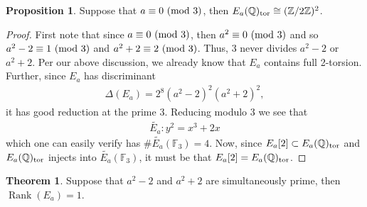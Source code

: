 \documentclass{article}
\newcommand{\Q}{\mathbb{Q}}
\newcommand{\Z}{\mathbb{Z}}
\theoremstyle{definition}
\newcommand{\F}{\mathbb{F}}
\newtheorem{theorem}{Theorem}[section]
\newtheorem{prop}{Proposition}
\DeclareMathOperator{\Rank}{Rank}
\begin{document}
\begin{prop}
    Suppose that $a \equiv 0 \textnormal{ (mod 3)}$, then $E_a(\Q)_\textnormal{tor} \cong (\Z/2\Z)^2$.
\end{prop}

\begin{proof}
    First note that since $a \equiv 0 \textnormal{ (mod 3)}$, then $a^2 \equiv 0 \textnormal{ (mod 3)}$ and so $a^2 - 2 \equiv 1 \textnormal{ (mod 3)}$ and $a^2 + 2 \equiv 2 \textnormal{ (mod 3)}$. Thus, $3$ never divides $a^2-2$ or $a^2+2$. Per our above discussion, we already know that $E_a$ contains full 2-torsion. Further, since $E_a$ has discriminant
    \begin{eqnarray*}
        \Delta(E_a) = 2^8(a^2-2)^2(a^2+2)^2,
    \end{eqnarray*}
    it has good reduction at the prime 3. Reducing modulo 3 we see that 
    \begin{eqnarray*}
        \tilde{E_a} \colon y^2 = x^3 + 2x
    \end{eqnarray*}
    which one can easily verify has $\#\tilde{E_a}(\F_3) = 4$. Now, since $E_a[2] \subset E_a(\Q)_\textnormal{tor}$ and $E_a(\Q)_\textnormal{tor}$ injects into $\tilde{E_a}(\F_3)$, it must be that $E_a[2] = E_a(\Q)_\textnormal{tor}$.
\end{proof}

\begin{theorem}
    Suppose that $a^2-2$ and $a^2 + 2$ are simultaneously prime, then $\Rank(E_a) = 1$. \label{rankE_a}
\end{theorem}
\end{document}
